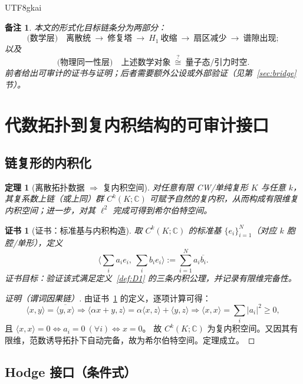 \documentclass[12pt]{article}
\newtheorem{theorem}{定理}[section]
\newtheorem{remark}{备注}[section]
\newtheorem{Certificate}{证书}[section]
\begin{document}
\begin{CJK*}{UTF8}{gkai}
\begin{remark}
\label{rem:goal}
本文的形式化目标链条分为两部分：
\[
\text{(数学层)}\quad \text{离散统}\ \to\ \text{修复塔}\ \to\ H_1\ \text{收缩}\ \to\ \text{扇区减少}\ \to\ \text{谱隙出现};
\]
以及
\[
\text{(物理同一性层)}\quad \text{上述数学对象}\ \overset{?}{\cong}\ \text{量子态/引力时空}.
\]
前者给出可审计的证书与证明；后者需要额外公设或外部验证（见第~\ref{sec:bridge} 节）。
\end{remark}

\clearpage
\section{代数拓扑到复内积结构的可审计接口}

\subsection{链复形的内积化}

\begin{theorem}[离散拓扑数据 $\Rightarrow$ 复内积空间]
\label{thm:T1}
对任意有限 CW/单纯复形 $K$ 与任意 $k$，其复系数上链（或上同）群 $C^k(K;\mathbb C)$ 可赋予自然的复内积，从而构成有限维复内积空间；进一步，对其 $\ell^2$ 完成可得到希尔伯特空间。
\end{theorem}

\begin{Certificate}[证书：标准基与内积构造]
\label{cert:T1}
取 $C^k(K;\mathbb C)$ 的标准基 $\{e_i\}_{i=1}^N$（对应 $k$ 胞腔/单形），定义
\[
\Big\langle \sum_i a_ie_i,\ \sum_i b_ie_i\Big\rangle:=\sum_{i=1}^N a_i\overline{b_i}.
\]
证书目标：验证该式满足定义~\ref{def:D1} 的三条内积公理，并记录有限维完备性。
\end{Certificate}

\begin{proof}[证明（谓词因果链）]
由证书~\ref{cert:T1} 的定义，逐项计算可得：
\[
\langle x,y\rangle=\overline{\langle y,x\rangle}
\Rightarrow
\langle \alpha x+y,z\rangle=\alpha\langle x,z\rangle+\langle y,z\rangle
\Rightarrow
\langle x,x\rangle=\sum_i |a_i|^2\ge 0,
\]
且 $\langle x,x\rangle=0\Leftrightarrow a_i=0\ (\forall i)\Leftrightarrow x=0$。
故 $C^k(K;\mathbb C)$ 为复内积空间。又因其有限维，范数诱导拓扑下自动完备，故为希尔伯特空间。定理成立。
\end{proof}

\subsection{Hodge 接口（条件式）}


\end{CJK*}
\end{document}

